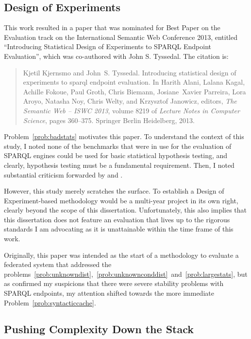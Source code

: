 \subsection{Design of Experiments}\label{sec:condoe}

This work resulted in a paper that was nominated for Best Paper on the
Evaluation track on the International Semantic Web Conference 2013,
entitled ``Introducing Statistical Design of Experiments to SPARQL
Endpoint Evaluation'', which was co-authored with John
S. Tyssedal. The citation is:

\begin{quote}
Kjetil Kjernsmo and John~S. Tyssedal.
\newblock Introducing statistical design of experiments to sparql endpoint
  evaluation.
\newblock In Harith Alani, Lalana Kagal, Achille Fokoue, Paul Groth, Chris
  Biemann, Josiane~Xavier Parreira, Lora Aroyo, Natasha Noy, Chris Welty, and
  Krzysztof Janowicz, editors, {\em The Semantic Web – ISWC 2013}, volume
  8219 of {\em Lecture Notes in Computer Science}, pages 360--375. Springer
  Berlin Heidelberg, 2013.
\end{quote}


Problem~\ref{prob:badstats} motivates this paper. 
To understand the context of this study, I noted none of the
benchmarks that were in use for the evaluation of SPARQL engines could
be used for basic statistical hypothesis testing, and clearly,
hypothesis testing must be a fundamental requirement. Then, I noted
substantial criticism forwarded by
\cite{Duan:2011:AOC:1989323.1989340} and \cite{MontoyaVCRA12}.

However, this study merely scratches the surface. To establish a
Design of Experiment-based methodology would be a multi-year project
in its own right, clearly beyond the scope of this
dissertation. Unfortunately, this also implies that this dissertation
does not feature an evaluation that lives up to the rigorous standards
I am advocating as it is unattainable within the time frame of this
work.

Originally, this paper was intended as the start of a methodology to
evaluate a federated system that addressed the
problems~\ref{prob:unknowndist},~\ref{prob:unknownconddist}~and~\ref{prob:largestats},
but as \cite{buil2013sparql} confirmed my suspicions that there were
severe stability problems with SPARQL endpoints, my attention shifted
towards the more immediate Problem~\ref{prob:syntacticcache}.

\subsection{Pushing Complexity Down the Stack}\label{sec:conpush}

